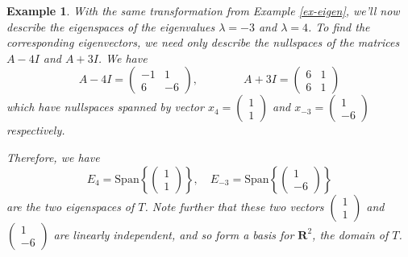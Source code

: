 \documentclass[12pt]{article}
\numberwithin{equation}{subsection}
\numberwithin{figure}{subsection}
\theoremstyle{note}
\newtheorem{example}[subsection]{Example}
\newcommand\Span[1]{\mathrm{Span}\left\{#1\right\}}
\begin{document}
\begin{example}
With the same transformation from Example \ref{ex-eigen}, we'll now describe the eigenspaces of the eigenvalues $\lambda=-3$ and $\lambda =4$. To find the corresponding eigenvectors, we need only describe the nullspaces of the matrices $A-4I$ and $A+3I$. We have \[ A-4I =\begin{pmatrix} -1 & 1 \\ 6 & -6\end{pmatrix}, \qquad \qquad A+3I = \begin{pmatrix} 6 & 1 \\ 6 & 1 \end{pmatrix}\] which have nullspaces spanned by vector $x_4 = \begin{pmatrix} 1 \\ 1 \end{pmatrix}$ and $x_{-3}=\begin{pmatrix} 1 \\ -6 \end{pmatrix}$ respectively. 

Therefore, we have \[ E_4= \Span{\begin{pmatrix} 1 \\ 1 \end{pmatrix}}, \quad E_{-3}=\Span{ \begin{pmatrix} 1 \\ -6 \end{pmatrix} }\]are the two eigenspaces of $T$. Note further that these two vectors $\begin{pmatrix} 1 \\ 1 \end{pmatrix}$ and $ \begin{pmatrix} 1 \\ -6 \end{pmatrix}$ are linearly independent, and so form a basis for $\mathbf{R}^2$, the domain of $T$. 
\end{example} 
\end{document}
